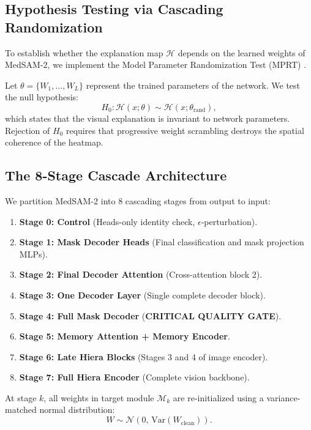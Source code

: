 \documentclass[journal,10pt,twocolumn]{IEEEtran}
\begin{document}
\subsection{Hypothesis Testing via Cascading Randomization}
To establish whether the explanation map $\mathcal{H}$ depends on the learned weights of MedSAM-2, we implement the Model Parameter Randomization Test (MPRT) \cite{adebayo2018sanity}. 

Let $\theta = \{ W_1, \dots, W_L \}$ represent the trained parameters of the network. We test the null hypothesis:
\begin{equation}
    H_0: \mathcal{H}(x; \theta) \sim \mathcal{H}(x; \theta_{\text{rand}}),
\end{equation}
which states that the visual explanation is invariant to network parameters. Rejection of $H_0$ requires that progressive weight scrambling destroys the spatial coherence of the heatmap.

\subsection{The 8-Stage Cascade Architecture}
We partition MedSAM-2 into 8 cascading stages from output to input:
\begin{enumerate}
    \item \textbf{Stage 0: Control} (Heads-only identity check, $\epsilon$-perturbation).
    \item \textbf{Stage 1: Mask Decoder Heads} (Final classification and mask projection MLPs).
    \item \textbf{Stage 2: Final Decoder Attention} (Cross-attention block 2).
    \item \textbf{Stage 3: One Decoder Layer} (Single complete decoder block).
    \item \textbf{Stage 4: Full Mask Decoder} (\textbf{CRITICAL QUALITY GATE}).
    \item \textbf{Stage 5: Memory Attention + Memory Encoder}.
    \item \textbf{Stage 6: Late Hiera Blocks} (Stages 3 and 4 of image encoder).
    \item \textbf{Stage 7: Full Hiera Encoder} (Complete vision backbone).
\end{enumerate}

At stage $k$, all weights in target module $\mathcal{M}_k$ are re-initialized using a variance-matched normal distribution:
\begin{equation}
    W \sim \mathcal{N}\left( 0, \, \text{Var}(W_{\text{clean}}) \right).
\end{equation}
\end{document}
